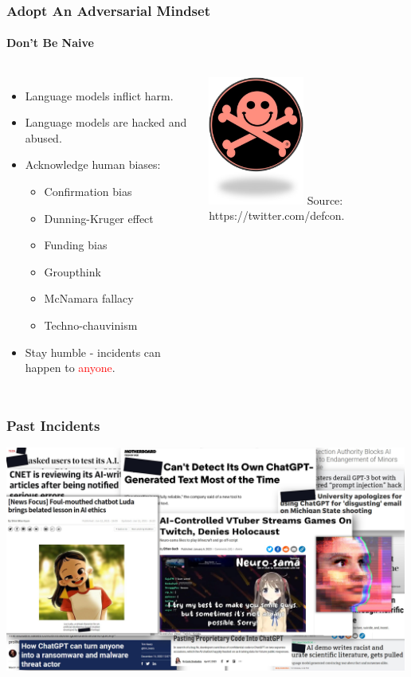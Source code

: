 \documentclass[11pt,
               aspectratio=169,
               hyperref={colorlinks}
               ]{beamer}
\begin{document}
		\begin{frame}
			
			\frametitle{Adopt An Adversarial Mindset}
			\framesubtitle{Don't Be Naive}
			
			\begin{columns}
				\vspace{-5pt}
				\begin{itemize}
					\item Language models inflict harm.				
					\item Language models are hacked and abused.		
					\item Acknowledge human biases:
						\begin{itemize}
							\item Confirmation bias
							\item Dunning-Kruger effect
							\item Funding bias
							\item Groupthink
							\item McNamara fallacy
							\item Techno-chauvinism
						\end{itemize}
					\item Stay humble - incidents can happen to \textcolor{red}{anyone}.
				\end{itemize}
				\centering
				\includegraphics[height=120pt]{../img/defcon.jpg}
				\newline
				\small{Source: https://twitter.com/defcon.}
			\end{columns}
					
		\end{frame}
		
		\begin{frame}
			
			\frametitle{Past Incidents}
			\centering
			\includegraphics[height=210pt]{../img/pastincidents.jpg}
								
		\end{frame}
		
\end{document}
